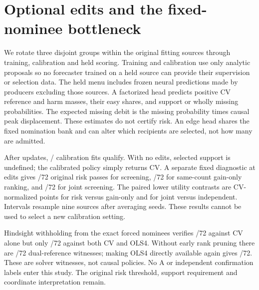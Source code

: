 \section{Optional edits and the fixed-nominee bottleneck}
\label{supp:cv-admission}
We rotate three disjoint groups within the original fitting sources through
training, calibration and held scoring. Training and calibration use only
analytic proposals so no forecaster trained on a held source can provide
their supervision or selection data. The held menu includes frozen neural
predictions made by producers excluding those sources. A factorized head
predicts positive CV reference and harm masses, their easy shares, and
support or wholly missing probabilities. The expected missing debit is the
missing probability times causal peak displacement. These estimates do not
certify risk. An edge head shares the fixed nomination bank and can alter
which recipients are selected, not how many are admitted.

After \AdmissionUpdates{} updates, \AdmissionQualified{}/\AdmissionCalibration{}
calibration fits qualify. With no edits, selected support is undefined;
the calibrated policy simply returns CV. A separate fixed diagnostic at
\AdmissionEdits{} edits gives \AdmissionIndependent{}/72 original risk passes
for screening, \AdmissionGain{}/72 for same-count gain-only ranking, and
\AdmissionJoint{}/72 for joint screening. The paired lower utility contrasts
are \AdmissionRiskContrast{} CV-normalized points for risk versus gain-only
and \AdmissionJointContrast{} for joint versus independent. Intervals
resample nine sources after averaging seeds. These results cannot be used
to select a new calibration setting.

Hindsight withholding from the exact forced nominees verifies
\AdmissionCV{}/72 against CV alone but only \AdmissionDual{}/72 against
both CV and OLS4. Without early rank pruning there are \AdmissionUnpruned{}/72
dual-reference witnesses; making OLS4 directly available again gives
\AdmissionAddBack{}/72. These are solver witnesses, not causal policies.
No A or independent confirmation labels enter this study. The original
risk threshold, support requirement and coordinate interpretation remain.
